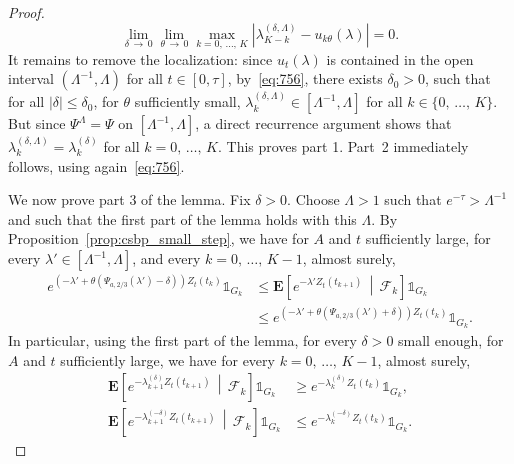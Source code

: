 \documentclass[AHL,Unicode,longabstracts,published]{cedram}
\newcommand*\E{\mathbf{E}}
\newcommand\F{\mathcal{F}}
\newcommand{\1} {\mathds{1}}
\renewcommand*\to{\rightarrow}
\begin{document}
\begin{proof}
\begin{equation}
\lim_{\delta\,\to\,0} \lim_{\theta\,\to\,0} \max_{k=0,\,\ldots,\,K} \left|\lambda_{K-k}^{(\delta,\Lambda)} - u_{k\theta}(\lambda)\right| = 0.
\end{equation}
It remains to remove the localization: since $u_t(\lambda)$ is contained in the open interval $(\Lambda^{-1},\Lambda)$ for all $t\in [0,\tau]$, by~\eqref{eq:756}, there exists $\delta_0>0$, such that for all $|\delta|\le \delta_0$, for $\theta$ sufficiently small, $\lambda_k^{(\delta,\Lambda)} \in [\Lambda^{-1},\Lambda]$ for all $k\in\{0,\,\ldots,\,K\}$. But since $\Psi^\Lambda = \Psi$ on $[\Lambda^{-1},\Lambda]$, a direct recurrence argument shows that $\lambda_k^{(\delta,\Lambda)} = \lambda_k^{(\delta)}$ for all $k=0,\,\ldots,\,K$. This proves part 1. Part~2 immediately follows, using again~\eqref{eq:756}.

We now prove part 3 of the lemma. Fix $\delta > 0$. Choose $\Lambda>1$ such that $e^{-\tau} > \Lambda^{-1}$ and such that the first part of the lemma holds with this $\Lambda$. By Proposition~\ref{prop:csbp_small_step}, we have for $A$ and $t$ sufficiently large, for every $\lambda'\in [\Lambda^{-1},\Lambda]$, and every $k=0,\,\ldots,\,K-1$, almost surely,
\begin{align*}
e^{\left(-\lambda' +\theta \left(\Psi_{a,2/3}\left(\lambda'\right)-\delta\right)\right) Z_t(t_k)}\1_{G_k} &\le \E\left[e^{-\lambda' Z_t\left(t_{k+1}\right)}\,\middle|\,\F_k\right]\1_{G_k}\\
&\le e^{\left(-\lambda' +\theta \left(\Psi_{a,2/3}\left(\lambda'\right)+\delta\right)\right) Z_t(t_k)}\1_{G_k}.
\end{align*}
In particular, using the first part of the lemma, for every $\delta>0$ small enough, for $A$ and $t$ sufficiently large, we have for every $k=0,\,\ldots,\,K-1$, almost surely,
\begin{align}\label{eq:753+}
\E\left[e^{-\lambda_{k+1}^{(\delta)} Z_t\left(t_{k+1}\right)}\,\middle|\,\F_k\right]\1_{G_k} &\ge e^{-\lambda_k^{(\delta)} Z_t(t_k)}\1_{G_k},\\\label{eq:753-}
\E\left[e^{-\lambda_{k+1}^{(-\delta)} Z_t\left(t_{k+1}\right)}\,\middle|\,\F_k\right]\1_{G_k} &\le e^{-\lambda_k^{(-\delta)} Z_t(t_k)}\1_{G_k}.
\end{align}


\end{proof}
\end{document}
